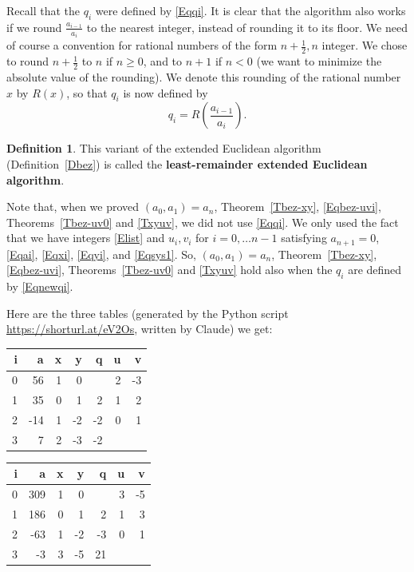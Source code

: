 \documentclass[12pt,letterpaper]{article}
\theoremstyle{definition}
\newtheorem{defn}[thm]{Definition}
\begin{document}
Recall that the $q_i$ were defined by \eqref{Eqqi}. It is clear that the algorithm also works if we round $\frac{a_{i-1}}{a_i}$ to the nearest integer, instead of rounding it to its floor. We need of course a convention for rational numbers of the form $n+\frac{1}{2}, n$ integer. We chose to round $n+\frac{1}{2}$ to $n$ if $n\ge0$, and to $n+1$ if $n<0$ (we want to minimize the absolute value of the rounding). We denote this rounding of the rational number $x$ by $R(x)$, so that $q_i$ is now defined by 
\begin{equation}\label{Eqnewqi}
q_i=R\left(\frac{a_{i-1}}{a_i}\right).
\end{equation} 

\begin{defn}\label{Dlreea}
This variant of the extended Euclidean algorithm (Definition~\ref{Dbez}) is called the \textbf{least-remainder extended Euclidean algorithm}.  
\end{defn}

Note that, when we proved $(a_0,a_1)=a_n$, Theorem~\ref{Tbez-xy}, \eqref{Eqbez-uvi}, Theorems~\ref{Tbez-uv0} and \ref{Txyuv}, we did not use \eqref{Eqqi}. We only used the fact that we have integers \eqref{Elist} and $u_i,v_i$ for $i=0,\ldots n-1$ satisfying $a_{n+1}=0$, \eqref{Eqai}, \eqref{Eqxi}, \eqref{Eqyi}, and \eqref{Eqsys1}. So, $(a_0,a_1)=a_n$, Theorem~\ref{Tbez-xy}, \eqref{Eqbez-uvi}, Theorems~\ref{Tbez-uv0} and \ref{Txyuv} hold also when the $q_i$ are defined by \eqref{Eqnewqi}. 

Here are the three tables (generated by the Python script \url{https://shorturl.at/eV2Os}, written by Claude) we get: %

\begin{table}[H]
    \centering
    \begin{tabular}{|r|r|r|r|r|r|r|}
    \hline
    i & a  &  x &  y & q &  u &  v \\ \hline
    0 & 56 & 1 & 0 &  & 2 & -3 \\ \hline
    1 & 35 & 0 & 1 & 2 & 1 & 2 \\ \hline
    2 & -14 & 1 & -2 & -2 & 0 & 1 \\ \hline
    3 & 7 & 2 & -3 & -2 &  &  \\ \hline
    \end{tabular}
\end{table}

\begin{table}[htbp]
    \centering
    \begin{tabular}{|r|r|r|r|r|r|r|}
    \hline
    i & a  &  x &  y & q &  u &  v \\ \hline
    0 & 309 & 1 & 0 &  & 3 & -5 \\ \hline
    1 & 186 & 0 & 1 & 2 & 1 & 3 \\ \hline
    2 & -63 & 1 & -2 & -3 & 0 & 1 \\ \hline
    3 & -3 & 3 & -5 & 21 &  &  \\ \hline
    \end{tabular}
\end{table}
\end{document}

